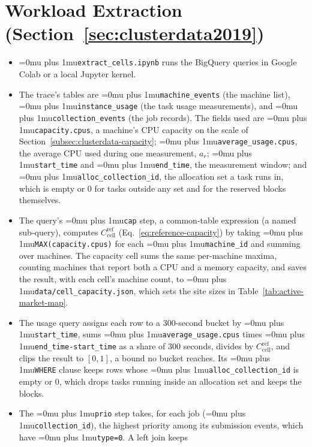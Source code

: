 \documentclass{UNCC-thesis}
\newcommand{\codepath}[1]{{\Urlmuskip=0mu plus 1mu\relax\nolinkurl{#1}}}
\begin{document}
\section{Workload Extraction (Section~\ref{sec:clusterdata2019})}
\begin{itemize}
  \item \codepath{extract_cells.ipynb} runs the BigQuery queries in
        Google Colab or a local Jupyter kernel.
  \item The trace's tables are \codepath{machine_events} (the machine list),
        \codepath{instance_usage} (the task usage measurements), and
        \codepath{collection_events} (the job records). The fields used are
        \codepath{capacity.cpus}, a machine's CPU capacity on the scale of
        Section~\ref{subsec:clusterdata-capacity};
        \codepath{average_usage.cpus}, the average CPU used during one
        measurement, \(a_r\); \codepath{start_time} and
        \codepath{end_time}, the measurement window; and
        \codepath{alloc_collection_id}, the allocation set a task runs in,
        which is empty or 0 for tasks outside any set and for the reserved
        blocks themselves.
  \item The query's \codepath{cap} step, a common-table expression (a named
        sub-query), computes
        \(C^{\mathrm{ref}}_{\mathrm{cell}}\) (Eq.~\eqref{eq:reference-capacity}) by
        taking \codepath{MAX(capacity.cpus)} for each \codepath{machine_id}
        and summing over machines. The capacity cell sums the same
        per-machine maxima, counting machines that report both a CPU and a
        memory capacity, and saves the result, with each cell's machine count, to
        \codepath{data/cell_capacity.json}, which sets the site sizes in
        Table~\ref{tab:active-market-map}.
  \item The usage query assigns each row to a 300-second bucket by
        \codepath{start_time}, sums \codepath{average_usage.cpus} times
        \codepath{end_time-start_time} as a share of 300 seconds, divides by
        \(C^{\mathrm{ref}}_{\mathrm{cell}}\), and clips the result to \([0,1]\), a bound no
        bucket reaches. Its \codepath{WHERE} clause keeps rows whose
        \codepath{alloc_collection_id} is empty or 0, which drops tasks
        running inside an allocation set and keeps the blocks.
  \item The \codepath{prio} step takes, for each job
        (\codepath{collection_id}), the highest priority among its
        submission events, which have \codepath{type=0}. A left join keeps

\end{itemize}
\end{document}
